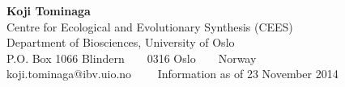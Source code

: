 \message{ !name(TominagaCV2.tex)}\documentclass[11pt, a4paper]{article}
\begin{document}
\begin{center} {\LARGE \textbf{Koji Tominaga}}
  \\
  Centre for Ecological and Evolutionary Synthesis (CEES)\\
  Department of Biosciences, University of Oslo\\
  P.O. Box 1066 Blindern\ \ \textbullet \ \ 0316 Oslo\ \ \textbullet \
  \ Norway
  \\
  koji.tominaga@ibv.uio.no \ \ \textbullet \ \ Information as of 23
  November 2014
\end{center}
\end{document}
